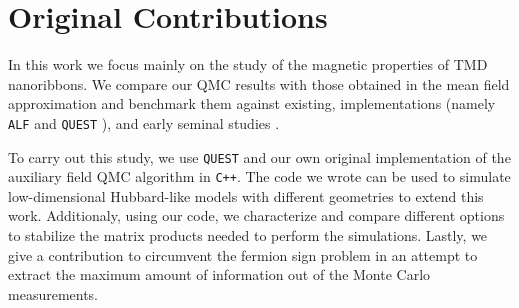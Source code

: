 \section{Original Contributions}
\label{sec:int_contributions}

In this work we focus mainly on the study of the magnetic properties of \ac{TMD} nanoribbons.
We compare our \ac{QMC} results with those obtained in the mean field approximation and benchmark them  against existing,   implementations (namely \texttt{ALF} \cite{bercx_alf_2017} and \texttt{QUEST} \cite{noauthor_quest_2012}), and early seminal studies \cite{hirsch_discrete_1983,white_numerical_1989}.

To carry out this study, we use \texttt{QUEST} and our own original implementation of the auxiliary field \ac{QMC} algorithm in \texttt{C++}.
The code we wrote can be used to simulate low-dimensional Hubbard-like models with different geometries to extend this work.
Additionaly, using our code, we characterize and compare different options to stabilize the matrix products needed to perform the simulations.
Lastly, we give a contribution to circumvent the fermion sign problem in an attempt to extract the maximum amount of information out of the Monte Carlo measurements.